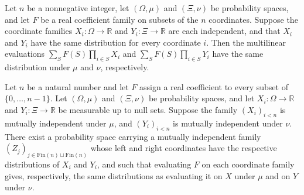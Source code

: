 \begin{theorem}
\label{BooleanAnalysis.GaussianSpace.Invariance.identDistrib_evalMultilinearRV}
\leanok
{}
Let $n$ be a nonnegative integer, let $(\Omega,\mu)$ and $(\Xi,\nu)$ be probability
spaces, and let $F$ be a real coefficient family on subsets of the $n$ coordinates.
Suppose the coordinate families $X_i:\Omega\to\mathbb R$ and $Y_i:\Xi\to\mathbb R$ are
each independent, and that $X_i$ and $Y_i$ have the same distribution for every
coordinate $i$. Then the multilinear evaluations $\sum_S F(S)\prod_{i\in S}X_i$ and
$\sum_S F(S)\prod_{i\in S}Y_i$ have the same distribution under $\mu$ and $\nu$,
respectively.
\end{theorem}

\begin{theorem}
\label{BooleanAnalysis.GaussianSpace.Invariance.independent_polynomial_coupling}
\leanok
{}
Let $n$ be a natural number and let $F$ assign a real coefficient to every subset of
$\{0,\ldots,n-1\}$. Let $(\Omega,\mu)$ and $(\Xi,\nu)$ be probability spaces, and let
$X_i:\Omega\to\mathbb R$ and $Y_i:\Xi\to\mathbb R$ be measurable up to null sets.
Suppose the family $(X_i)_{i<n}$ is mutually independent under $\mu$, and $(Y_i)_{i<n}$
is mutually independent under $\nu$. There exist a probability space carrying a mutually
independent family $(Z_j)_{j\in\mathrm{Fin}(n)\sqcup\mathrm{Fin}(n)}$ whose left and
right coordinates have the respective distributions of $X_i$ and $Y_i$, and such that
evaluating $F$ on each coordinate family gives, respectively, the same distributions as
evaluating it on $X$ under $\mu$ and on $Y$ under $\nu$.
\end{theorem}
